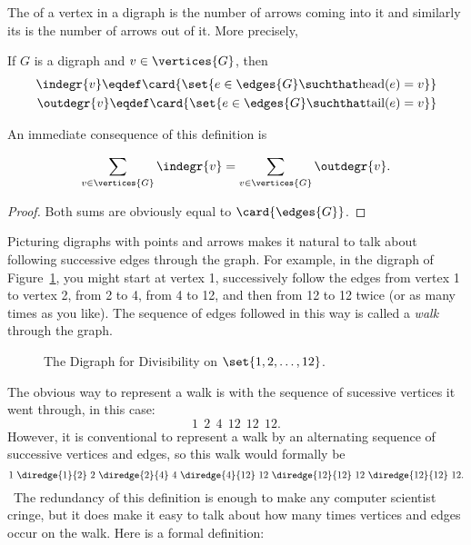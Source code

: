 The  of a vertex in a digraph is the number of arrows
coming into it and similarly its  is the number of
arrows out of it.  More precisely,
\begin{definition}\label{digraph-degree}
If $G$ is a digraph and $v \in \vertices{G}$, then
\begin{align*}
\indegr{v} \eqdef \card{\set{ e \in \edges{G} \suchthat \text{head}(e) = v}}\\
\outdegr{v} \eqdef \card{\set{ e \in \edges{G} \suchthat \text{tail}(e) = v}}\\
\end{align*}
\end{definition}

An immediate consequence of this definition is
\begin{lemma}\label{digraph-handshake}
\[
\sum_{v \in \vertices{G}} \indegr{v} = \sum_{v \in \vertices{G}} \outdegr{v}.
\]
\end{lemma}
\begin{proof}
Both sums are obviously equal to $\card{\edges{G}}$.
\end{proof}

\iffalse     %
\begin{problems}
\examproblems
\pinput{FP_outdegree_induction}
\end{problems}
\section{Digraph Walks and Paths}
\fi

Picturing digraphs with points and arrows makes it natural to talk
about following successive edges through the graph.  For example, in
the digraph of Figure~\ref{fig:divisibility-digraph}, you might start
at vertex 1, successively follow the edges from vertex 1 to vertex 2,
from 2 to 4, from 4 to 12, and then from 12 to 12 twice (or as many
times as you like).  The sequence of edges followed in this way is
called a \emph{walk} through the graph.

\begin{figure}
\caption{The Digraph for Divisibility on $\set{1,2,\dots,12}$.}
\label{fig:divisibility-digraph}
\end{figure}

The obvious way to represent a walk is with the sequence of sucessive
vertices it went through, in this case:
\[
1\ \:2\ \:4\ \:12\ \:12\ \:12.
\]
However, it is conventional to represent a walk by an alternating
sequence of successive vertices and edges, so this walk would formally
be
\begin{equation}\label{walk12412}
1\ \diredge{1}{2}\  2\  \diredge{2}{4}\  4\ \diredge{4}{12}\  12\ 
\diredge{12}{12}\  12\ \diredge{12}{12}\  12.
\end{equation}\
The redundancy of this definition is enough to make any computer
scientist cringe, but it does make it easy to talk about how many
times vertices and edges occur on the walk.  Here is a formal
definition:

